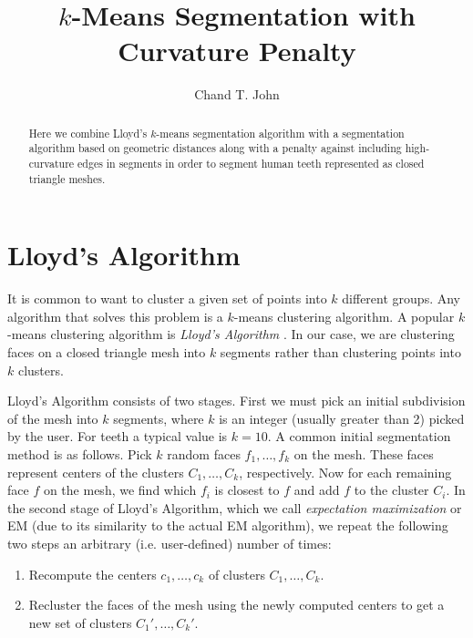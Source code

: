 \documentclass{article}
\author{Chand T. John}
\title{$k$-Means Segmentation with Curvature Penalty}
\begin{document}
\maketitle


\begin{abstract}
Here we combine Lloyd's $k$-means segmentation algorithm with a segmentation
algorithm based on geometric distances along with a penalty against including
high-curvature edges in segments in order to segment human teeth represented
as closed triangle meshes.
\end{abstract}


\section{Lloyd's Algorithm}
It is common to want to cluster a given set of points into $k$ different
groups.  Any algorithm that solves this problem is a $k$-means clustering
algorithm.  A popular $k$-means clustering algorithm is {\em Lloyd's
Algorithm} \cite{kmeans}.  In our case, we are clustering faces on a closed
triangle mesh into $k$ segments rather than clustering points into $k$
clusters.

Lloyd's Algorithm consists of two stages.  First we must pick an initial
subdivision of the mesh into $k$ segments, where $k$ is an integer (usually
greater than 2) picked by the user.  For teeth a typical value is $k=10$.  A
common initial segmentation method is as follows.  Pick $k$ random faces
$f_1, \ldots, f_k$ on the mesh.  These faces represent centers of the clusters
$C_1, \ldots, C_k$, respectively.  Now for each remaining face $f$ on the
mesh, we find which $f_i$ is closest to $f$ and add $f$ to the cluster $C_i$.
In the second stage of Lloyd's Algorithm, which we call {\em expectation
maximization} or EM (due to its similarity to the actual EM algorithm), we
repeat the following two steps an arbitrary (i.e. user-defined) number of
times:
\begin{enumerate}
\item Recompute the centers $c_1, \ldots, c_k$ of clusters $C_1, \ldots, C_k$.
\item Recluster the faces of the mesh using the newly computed centers to get
a new set of clusters $C_1', \ldots, C_k'$.
\end{enumerate}
\end{document}
